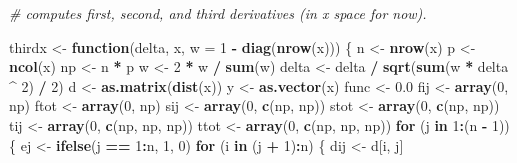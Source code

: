\documentclass[
  12pt,
]{article}
\newenvironment{Shaded}{\begin{snugshade}}{\end{snugshade}}
\newcommand{\AttributeTok}[1]{\textcolor[rgb]{0.13,0.29,0.53}{#1}}
\newcommand{\CommentTok}[1]{\textcolor[rgb]{0.56,0.35,0.01}{\textit{#1}}}
\newcommand{\ControlFlowTok}[1]{\textcolor[rgb]{0.13,0.29,0.53}{\textbf{#1}}}
\newcommand{\DecValTok}[1]{\textcolor[rgb]{0.00,0.00,0.81}{#1}}
\newcommand{\FloatTok}[1]{\textcolor[rgb]{0.00,0.00,0.81}{#1}}
\newcommand{\FunctionTok}[1]{\textcolor[rgb]{0.13,0.29,0.53}{\textbf{#1}}}
\newcommand{\NormalTok}[1]{#1}
\newcommand{\OtherTok}[1]{\textcolor[rgb]{0.56,0.35,0.01}{#1}}
\newcommand{\SpecialCharTok}[1]{\textcolor[rgb]{0.81,0.36,0.00}{\textbf{#1}}}
\begin{document}
\begin{Shaded}
\begin{Highlighting}[]
\CommentTok{\# computes first, second, and third derivatives (in x space for now).}

\NormalTok{thirdx }\OtherTok{\textless{}{-}} \ControlFlowTok{function}\NormalTok{(delta, x, }\AttributeTok{w =} \DecValTok{1} \SpecialCharTok{{-}} \FunctionTok{diag}\NormalTok{(}\FunctionTok{nrow}\NormalTok{(x))) \{}
\NormalTok{  n }\OtherTok{\textless{}{-}} \FunctionTok{nrow}\NormalTok{(x)}
\NormalTok{  p }\OtherTok{\textless{}{-}} \FunctionTok{ncol}\NormalTok{(x)}
\NormalTok{  np }\OtherTok{\textless{}{-}}\NormalTok{ n }\SpecialCharTok{*}\NormalTok{ p}
\NormalTok{  w }\OtherTok{\textless{}{-}} \DecValTok{2} \SpecialCharTok{*}\NormalTok{ w }\SpecialCharTok{/} \FunctionTok{sum}\NormalTok{(w)}
\NormalTok{  delta }\OtherTok{\textless{}{-}}\NormalTok{ delta }\SpecialCharTok{/} \FunctionTok{sqrt}\NormalTok{(}\FunctionTok{sum}\NormalTok{(w }\SpecialCharTok{*}\NormalTok{ delta }\SpecialCharTok{\^{}} \DecValTok{2}\NormalTok{) }\SpecialCharTok{/} \DecValTok{2}\NormalTok{)}
\NormalTok{  d }\OtherTok{\textless{}{-}} \FunctionTok{as.matrix}\NormalTok{(}\FunctionTok{dist}\NormalTok{(x))}
\NormalTok{  y }\OtherTok{\textless{}{-}} \FunctionTok{as.vector}\NormalTok{(x)}
\NormalTok{  func }\OtherTok{\textless{}{-}} \FloatTok{0.0}
\NormalTok{  fij }\OtherTok{\textless{}{-}} \FunctionTok{array}\NormalTok{(}\DecValTok{0}\NormalTok{, np)}
\NormalTok{  ftot }\OtherTok{\textless{}{-}} \FunctionTok{array}\NormalTok{(}\DecValTok{0}\NormalTok{, np)}
\NormalTok{  sij }\OtherTok{\textless{}{-}} \FunctionTok{array}\NormalTok{(}\DecValTok{0}\NormalTok{, }\FunctionTok{c}\NormalTok{(np, np))}
\NormalTok{  stot }\OtherTok{\textless{}{-}} \FunctionTok{array}\NormalTok{(}\DecValTok{0}\NormalTok{, }\FunctionTok{c}\NormalTok{(np, np))}
\NormalTok{  tij }\OtherTok{\textless{}{-}} \FunctionTok{array}\NormalTok{(}\DecValTok{0}\NormalTok{, }\FunctionTok{c}\NormalTok{(np, np, np))}
\NormalTok{  ttot }\OtherTok{\textless{}{-}} \FunctionTok{array}\NormalTok{(}\DecValTok{0}\NormalTok{, }\FunctionTok{c}\NormalTok{(np, np, np))}
  \ControlFlowTok{for}\NormalTok{ (j }\ControlFlowTok{in} \DecValTok{1}\SpecialCharTok{:}\NormalTok{(n }\SpecialCharTok{{-}} \DecValTok{1}\NormalTok{)) \{}
\NormalTok{    ej }\OtherTok{\textless{}{-}} \FunctionTok{ifelse}\NormalTok{(j }\SpecialCharTok{==} \DecValTok{1}\SpecialCharTok{:}\NormalTok{n, }\DecValTok{1}\NormalTok{, }\DecValTok{0}\NormalTok{)}
    \ControlFlowTok{for}\NormalTok{ (i }\ControlFlowTok{in}\NormalTok{ (j }\SpecialCharTok{+} \DecValTok{1}\NormalTok{)}\SpecialCharTok{:}\NormalTok{n) \{}
\NormalTok{      dij }\OtherTok{\textless{}{-}}\NormalTok{ d[i, j]}

\end{Highlighting}
\end{Shaded}
\end{document}
